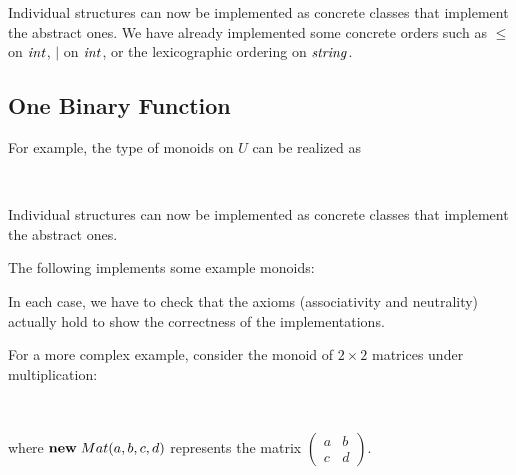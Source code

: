 Individual structures can now be implemented as concrete classes that implement the abstract ones.
We have already implemented some concrete orders such as $\leq$ on $\mathit{int}$, $|$ on $\mathit{int}$, or the lexicographic ordering on $\mathit{string}$.

\subsection{One Binary Function}

For example, the type of monoids on $U$ can be realized as
\begin{acode}
\\
\end{acode}

Individual structures can now be implemented as concrete classes that implement the abstract ones.

The following implements some example monoids:
\begin{acode}
\end{acode}

\begin{acode}
\end{acode}

\begin{acode}
\end{acode}

\begin{acode}
\end{acode}
In each case, we have to check that the axioms (associativity and neutrality) actually hold to show the correctness of the implementations.

For a more complex example, consider the monoid of $2\times 2$ matrices under multiplication:
\begin{acode}
\\
\end{acode}
where ${\rm \bf new}\; Mat(a,b,c,d)$ represents the matrix $\begin{pmatrix}a & b \\ c & d\end{pmatrix}$.

